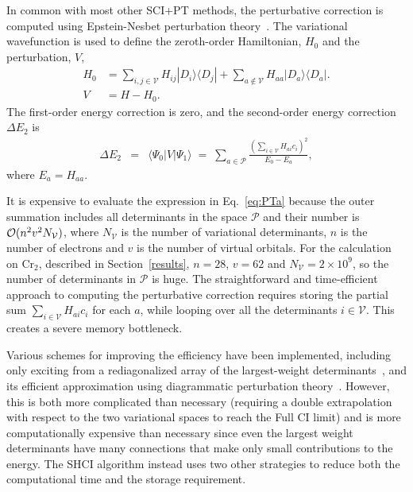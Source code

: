 \documentclass[%
preprint,
 superscriptaddress,
 amsmath,amssymb,
 aps,
]{revtex4-1}
\def\beq{\begin{eqnarray}}
\def\eeq{\end{eqnarray}}
\def\V{\mathcal{V}}
\def\P{\mathcal{P}}
\begin{document}
In common with most other SCI+PT methods, the perturbative correction is
computed using Epstein-Nesbet perturbation theory~\cite{Eps-PR-26,Nes-PRS-55}.
The variational wavefunction is used to define the zeroth-order Hamiltonian, $H_0$ and the perturbation, $V$,
\begin{align}
H_0 &= \sum_{i,j \in \V} H_{ij} |D_i\rangle\langle D_j| + \sum_{a \notin \V } H_{aa} |D_a\rangle\langle D_a|. \nonumber\\
V &= H - H_0 . \label{eq:part}
\end{align}
The first-order energy correction is zero, and the second-order energy correction $\Delta E_{2}$ is
\beq
 \Delta E_{2} &=& \langle\Psi_0|V|\Psi_1\rangle
 \;=\; \sum_{a \in \P} \frac{\left(\sum_{i \in \V} H_{ai} c_i\right)^2}{E_0 - E_a},
\label{eq:PTa}
\eeq
where $E_a=H_{aa}$.

It is expensive to evaluate the expression in Eq.~\ref{eq:PTa} because the outer summation includes all determinants in the space $\P$ and their number is
${\cal O}(n^2v^2N_\V)$, where $N_\V$ is the number of variational determinants, $n$ is the number of electrons and $v$ is
the number of virtual orbitals. For the calculation on Cr$_2$, described in Section~\ref{results},
$n=28$, $v=62$ and $N_\V=2 \times 10^9$, so the number of determinants in $\P$ is huge.
The straightforward
and time-efficient approach to computing the perturbative correction requires storing
the partial sum $\sum_{i \in \V} H_{ai} c_i$ for each $a$, while
looping over all the determinants $i\in\V$. This creates a severe memory bottleneck.

Various schemes for improving the efficiency have been implemented, including only exciting from
a rediagonalized array of the largest-weight determinants~\cite{EvaDauMal-CP-83}, and its efficient approximation using
diagrammatic perturbation theory~\cite{CimPer-JCoP-87}.
However, this is both more complicated than necessary (requiring a double extrapolation with respect to the two
variational spaces to reach the Full CI limit) and is more computationally expensive than necessary since even
the largest weight determinants have many connections that make only small contributions to the energy.
The SHCI algorithm instead uses two other strategies to reduce both the computational time and the storage requirement.
\end{document}

